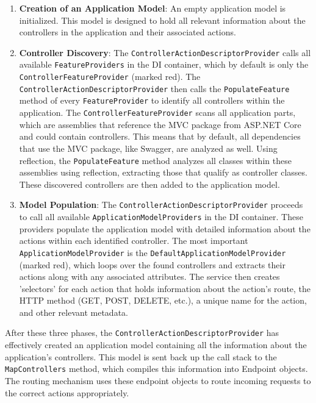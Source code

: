 \begin{enumerate}
    \item \textbf{Creation of an Application Model}: An empty application model is initialized. This model is designed to hold all relevant information about the controllers in the application and their associated actions.

    \item \textbf{Controller Discovery}: The \texttt{ControllerActionDescriptorProvider} calls all available \texttt{FeatureProviders} in the DI container, which by default is only the \texttt{ControllerFeatureProvider} (marked red). The \texttt{ControllerActionDescriptorProvider} then calls the \texttt{PopulateFeature} method of every \texttt{FeatureProvider} to identify all controllers within the application. The \texttt{ControllerFeatureProvider} scans all application parts, which are assemblies that reference the MVC package from ASP.NET Core and could contain controllers. This means that by default, all dependencies that use the MVC package, like Swagger, are analyzed as well. Using reflection, the \texttt{PopulateFeature} method analyzes all classes within these assemblies using reflection, extracting those that qualify as controller classes. These discovered controllers are then added to the application model.

    \item \textbf{Model Population}: The \texttt{ControllerActionDescriptorProvider} proceeds to call all available \texttt{ApplicationModelProviders} in the DI container. These providers populate the application model with detailed information about the actions within each identified controller. The most important \texttt{ApplicationModelProvider} is the \texttt{DefaultApplicationModelProvider} (marked red), which loops over the found controllers and extracts their actions along with any associated attributes. The service then creates 'selectors' for each action that holds information about the action's route, the HTTP method (GET, POST, DELETE, etc.), a unique name for the action, and other relevant metadata.
\end{enumerate}

After these three phases, the \texttt{ControllerActionDescriptorProvider} has effectively created an application model containing all the information about the application's controllers. This model is sent back up the call stack to the \texttt{MapControllers} method, which compiles this information into Endpoint objects. The routing mechanism uses these endpoint objects to route incoming requests to the correct actions appropriately.

